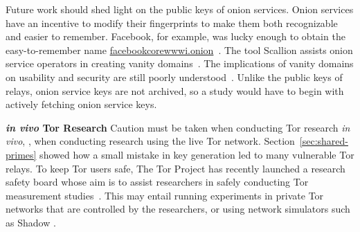 Future work should shed light on the public keys of onion services.  Onion
services have an incentive to modify their fingerprints to make them both
recognizable and easier to remember.  Facebook, for example, was lucky enough to
obtain the easy-to-remember name \url{facebookcorewwwi.onion}~\cite{facebook}.
The tool Scallion assists onion service operators in creating vanity
domains~\cite{scallion}.  The implications of vanity domains on usability and
security are still poorly understood~\cite{vanity-domains}.  Unlike the public
keys of relays, onion service keys are not archived, so a study would have to
begin with actively fetching onion service keys.

\textbf{\textit{in vivo} Tor Research}
Caution must be taken when conducting Tor research \textit{in vivo}, \ie, when
conducting research using the live Tor network.  Section~\ref{sec:shared-primes}
showed how a small mistake in key generation led to many vulnerable Tor relays.
To keep Tor users safe, The Tor Project has recently launched a research safety
board whose aim is to assist researchers in safely conducting Tor measurement
studies~\cite{safety-board}.  This may entail running experiments in private Tor
networks that are controlled by the researchers, or using network simulators
such as Shadow \cite{stem}.
